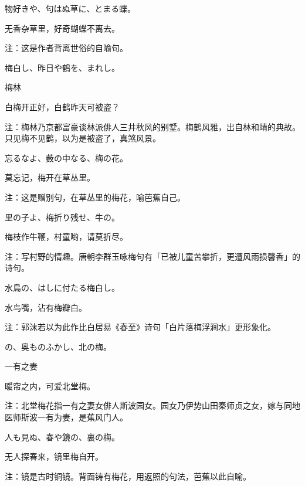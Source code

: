 \begin{haiku}
    {\FH 物好きや、匂はぬ草に、とまる蝶。}

    {\FK 无香杂草里，好奇蝴蝶不离去。}

    {\FT 注：这是作者背离世俗的自喻句。}
\end{haiku}

\begin{haiku}
    {\FH 梅白し、昨日や鶴を、まれし。}

    {\FK 梅林}

    {\FK 白梅开正好，白鹤昨天可被盗？}

    {\FT 注：梅林乃京都富豪谈林派俳人三井秋风的别墅。梅鹤风雅，出自林和靖的典故。只见梅不见鹤，以为是被盗了，真煞风景。}
\end{haiku}

\begin{haiku}
    {\FH 忘るなよ、薮の中なる、梅の花。}

    {\FK 莫忘记，梅开在草丛里。}

    {\FT 注：这是赠别句，在草丛里的梅花，喻芭蕉自己。}
\end{haiku}

\begin{haiku}
    {\FH 里の子よ、梅折り残せ、牛の。}

    {\FK 梅枝作牛鞭，村童哟，请莫折尽。}

    {\FT 注：写村野的情趣。唐朝李群玉咏梅句有「已被儿童苦攀折，更遭风雨损馨香」的诗句。}
\end{haiku}

\begin{haiku}
    {\FH 水鳥の、はしに付たる梅白し。}

    {\FK 水鸟嘴，沾有梅瓣白。}

    {\FT 注：郭沫若以为此作比白居易《春至》诗句「白片落梅浮涧水」更形象化。}
\end{haiku}

\begin{haiku}
    {\FH {}の、奥ものふかし、北の梅。}

    {\FK 一有之妻}

    {\FK 暖帘之内，可爱北堂梅。}

    {\FT 注：北堂梅花指一有之妻女俳人斯波园女。园女乃伊势山田秦师贞之女，嫁与同地医师斯波一有为妻，是蕉风门人。}
\end{haiku}

\begin{haiku}
    {\FH 人も見ぬ、春や鏡の、裏の梅。}

    {\FK 无人探春来，镜里梅自开。}

    {\FT 注：镜是古时铜镜。背面铸有梅花，用返照的句法，芭蕉以此自喻。}
\end{haiku}

